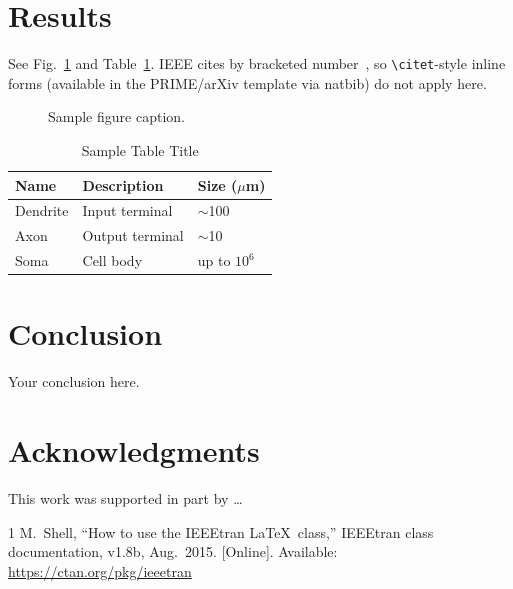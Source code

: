 \documentclass[lettersize,journal]{IEEEtran}
\begin{document}
\section{Results}
\lipsum[5] See Fig.~\ref{fig:fig1} and Table~\ref{tab:table}. IEEE cites by
bracketed number~\cite{shell2015ieeetran}, so \verb+\citet+-style inline forms
(available in the PRIME/arXiv template via natbib) do not apply here.

\begin{figure}[!t]
  \centering
  \fbox{\rule[-.5cm]{4cm}{3cm}}
  \caption{Sample figure caption.}
  \label{fig:fig1}
\end{figure}

\begin{table}[!t]
  \caption{Sample Table Title}
  \label{tab:table}
  \centering
  \begin{tabular}{lll}
    \toprule
    Name     & Description     & Size ($\mu$m) \\
    \midrule
    Dendrite & Input terminal  & $\sim$100     \\
    Axon     & Output terminal & $\sim$10      \\
    Soma     & Cell body       & up to $10^6$  \\
    \bottomrule
  \end{tabular}
\end{table}

\section{Conclusion}
Your conclusion here.

\section*{Acknowledgments}
This work was supported in part by \dots

%     
%     
\begin{thebibliography}{1}
M.~Shell, ``How to use the IEEEtran \LaTeX\ class,'' IEEEtran class
documentation, v1.8b, Aug.\ 2015. [Online]. Available:
\url{https://ctan.org/pkg/ieeetran}
\end{thebibliography}

\end{document}
